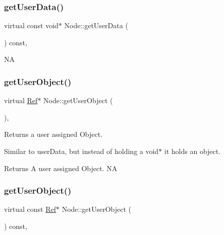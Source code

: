 \subsubsection{\texorpdfstring{get\+User\+Data()}{getUserData()}\hspace{0.1cm}{\footnotesize\ttfamily [4/4]}}
{\footnotesize\ttfamily virtual const void$\ast$ Node\+::get\+User\+Data (\begin{DoxyParamCaption}{ }\end{DoxyParamCaption}) const\hspace{0.3cm}{\ttfamily [inline]}, {\ttfamily [virtual]}}

NA \mbox{\label{classNode_a246218e1f2be9fc931be00c9c42a7817}} 
\subsubsection{\texorpdfstring{get\+User\+Object()}{getUserObject()}\hspace{0.1cm}{\footnotesize\ttfamily [1/4]}}
{\footnotesize\ttfamily virtual \hyperlink{classRef}{Ref}$\ast$ Node\+::get\+User\+Object (\begin{DoxyParamCaption}{ }\end{DoxyParamCaption})\hspace{0.3cm}{\ttfamily [inline]}, {\ttfamily [virtual]}}

Returns a user assigned Object.

Similar to user\+Data, but instead of holding a void$\ast$ it holds an object.

\begin{DoxyReturn}{Returns}
A user assigned Object.  NA 
\end{DoxyReturn}
\mbox{\label{classNode_a6bc05a48edd6e805bbe970fd62a4a48d}} 
\subsubsection{\texorpdfstring{get\+User\+Object()}{getUserObject()}\hspace{0.1cm}{\footnotesize\ttfamily [2/4]}}
{\footnotesize\ttfamily virtual const \hyperlink{classRef}{Ref}$\ast$ Node\+::get\+User\+Object (\begin{DoxyParamCaption}{ }\end{DoxyParamCaption}) const\hspace{0.3cm}{\ttfamily [inline]}, {\ttfamily [virtual]}}

